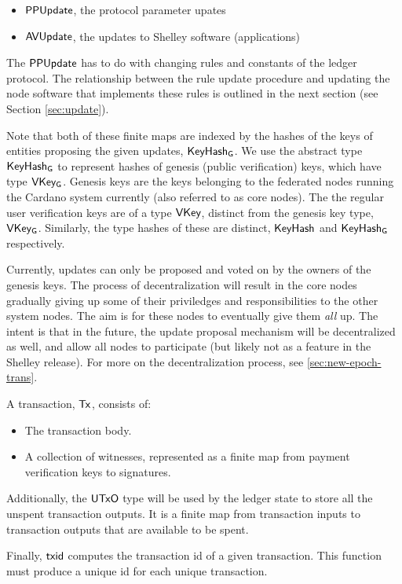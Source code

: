 \begin{itemize}
  \item $\mathsf{PPUpdate}$, the protocol parameter upates
  \item $\mathsf{AVUpdate}$, the updates to Shelley software (applications)
\end{itemize}

The $\mathsf{PPUpdate}$ has to do with changing rules and constants of the ledger
protocol. The relationship between the rule update procedure and updating the
node software that implements these rules is outlined in the next section
(see Section \ref{sec:update}).

Note that both of these finite maps are indexed by the hashes of the keys of
entities proposing the given
updates, $\mathsf{KeyHash_G}$.
We use the abstract type $\mathsf{KeyHash_G}$ to represent hashes of genesis
(public verification) keys, which have type $\mathsf{VKey_G}$.
Genesis keys are the keys belonging to the federated
nodes running the Cardano system currently (also referred to as core nodes).
The the regular user verification keys are of a type $\mathsf{VKey}$, distinct from the
genesis key type, $\mathsf{VKey_G}$. Similarly, the type hashes of these
are distinct, $\mathsf{KeyHash}$ and $\mathsf{KeyHash_G}$ respectively.

Currently, updates
can only be proposed and voted on by the owners of the genesis keys.
The process of decentralization will result in the core nodes gradually giving up
some of their priviledges and responsibilities to the other system nodes.
The aim is for these nodes to eventually give them \textit{all} up.
The intent is that in the future, the update proposal mechanism will
be decentralized as well, and allow all nodes to participate (but likely
not as a feature in the Shelley release).
For more on the decentralization process,
see \ref{sec:new-epoch-trans}.

A transaction, $\mathsf{Tx}$, consists of:

\begin{itemize}
  \item The transaction body.
  \item A collection of witnesses, represented as a finite map from payment verification keys
    to signatures.
\end{itemize}

Additionally, the $\mathsf{UTxO}$ type will be used by the ledger state to store all the
unspent transaction outputs. It is a finite map from transaction inputs
to transaction outputs that are available to be spent.

Finally, $\mathsf{txid}$ computes the transaction id of a given transaction.
This function must produce a unique id for each unique transaction.

